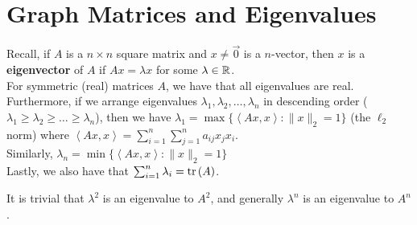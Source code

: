 \section{Graph Matrices and Eigenvalues}
\begin{definition}[Eigenvalues]
	Recall, if \(A\) is a \(n\times n\) square matrix and \(x\neq \vec{0}\) is a \(n\)-vector, then \(x\) is a \textbf{eigenvector} of \(A\) if \(Ax = \lambda x\) for some \(\lambda \in \mathbb{R}\). \\For symmetric (real) matrices \(A\), we have that all eigenvalues are real. Furthermore, if we arrange eigenvalues \(\lambda_1, \lambda_2	, \ldots, \lambda_{n}\) in descending order (\(\lambda_1\ge \lambda_2 \ge \ldots \ge \lambda_{n}\)), then we have \(\lambda_1 = \max \{ \left<Ax, x \right> : \|x\|_{2}  =1\}\) (the \(\ell_2\) norm) where \(\left<Ax, x \right> = \sum_{i= 1}^{n} \sum_{j=1}^{n} a_{ij}x_{j}x_{i}\).\\ Similarly, \(\lambda_{n} = \min \{ \left<Ax, x \right> : \|x\|_{2}=1 \}\)\\
	Lastly, we also have that \(\sum_{i= 1}^{n} \lambda_{i} = \operatorname{tr}\left( A \right) \).
\end{definition}
\begin{remark}
	It is trivial that \(\lambda^2\) is an eigenvalue to \(A^2\), and generally \(\lambda^{n}\) is an eigenvalue to \(A^{n}\).
\end{remark}

